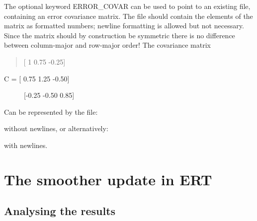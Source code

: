 \documentclass[a4paper,10pt,english]{sphinxmanual}
\begin{document}
The optional keyword ERROR\_COVAR can be used to point to an existing
file, containing an error covariance matrix. The file should contain
the elements of the matrix as formatted numbers; newline formatting is
allowed but not necessary. Since the matrix should by construction be
symmetric there is no difference between column-major and row-major
order! The covariance matrix
\begin{quote}

{[} 1      0.75  -0.25{]}
\end{quote}
\begin{description}
\item[{C =  {[} 0.75   1.25  -0.50{]}}] \leavevmode
{[}-0.25  -0.50   0.85{]}

\end{description}

Can be represented by the file:

%
\begin{sphinxVerbatim}[commandchars=\\\{\}]
\end{sphinxVerbatim}

without newlines, or alternatively:

%
\begin{sphinxVerbatim}[commandchars=\\\{\}]
         
      
     
\end{sphinxVerbatim}

with newlines.


\chapter{The smoother update in ERT}
\label{\detokenize{update/index:the-smoother-update-in-ert}}\label{\detokenize{update/index::doc}}

\section{Analysing the results}
\label{\detokenize{update/index:analysing-the-results}}
\end{document}
